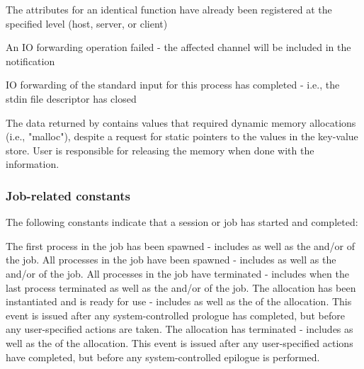 \begin{constantdesc}
%
The attributes for an identical function have already been registered at the specified level (host, server, or client)

%
An \ac{IO} forwarding operation failed - the affected channel will be included in the notification

%
\ac{IO} forwarding of the standard input for this process has completed - i.e., the stdin file descriptor has closed

%
The data returned by  contains values that required dynamic memory allocations (i.e., "malloc"), despite a request for static pointers to the values in the key-value store. User is responsible for releasing the memory when done with the information.

\end{constantdesc}

\subsubsection{Job-related constants}
\label{api:struct:jobconst}

The following constants indicate that a session or job has started and completed:

\begin{constantdesc}

%
The first process in the job has been spawned - includes  as well as the  and/or  of the job.
%
All processes in the job have been spawned - includes  as well as the  and/or  of the job.
%
All processes in the job have terminated - includes  when the last process terminated as well as the  and/or  of the job.
%
The allocation has been instantiated and is ready for use - includes  as well as the  of the allocation. This event is issued after any system-controlled prologue has completed, but before any user-specified actions are taken.
%
The allocation has terminated - includes  as well as the  of the allocation. This event is issued after any user-specified actions have completed, but before any system-controlled epilogue is performed.

\end{constantdesc}

